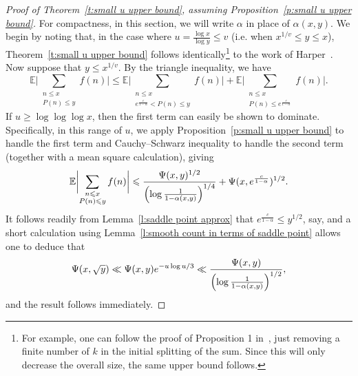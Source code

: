 \documentclass[12pt,a4paper,reqno]{amsart}
\numberwithin{equation}{section}
\def\E{\mathbb E}
\def\leq {\leqslant}
\theoremstyle{remark}
\theoremstyle{definition}
\numberwithin{equation}{section}
\theoremstyle{remark}
\def\E{\mathbb E}
\begin{document}
\begin{proof}[Proof of Theorem~\ref{t:small u upper bound}, assuming Proposition~\ref{p:small u upper bound}]
For compactness, in this section, we will write $\alpha$ in place of $\alpha(x,y)$. We begin by noting that, in the case where $u = \frac{\log x}{\log y} \leq v$ (i.e. when $x^{1/v} \leq y \leq x$), Theorem~\ref{t:small u upper bound} follows identically\footnote{For example, one can follow the proof of Proposition 1 in~\cite[Section~2.4]{HarperLow}, just removing a finite number of $k$ in the initial splitting of the sum. Since this will only decrease the overall size, the same upper bound follows.} to the work of Harper~\cite{HarperLow}. Now suppose that $y \leq x^{1/v}$. By the triangle inequality, we have
\begin{equation}\label{equ:ub triangle ineq}
\E \biggl| \sum_{\substack{n \leq x \\ P(n) \leq y}} f(n) \biggr| \leq \E \biggl| \sum_{\substack{n \leq x \\ e^{\frac{c}{1-\alpha}} < P(n) \leq y}} f(n) \biggr| + \E \biggl| \sum_{\substack{n \leq x \\ P(n) \leq e^{\frac{c}{1-\alpha}}}} f(n) \biggr| .
\end{equation}
If $u \geq \log \log \log x$, then the first term can easily be shown to dominate. Specifically, in this range of $u$, we apply Proposition~\ref{p:small u upper bound} to handle the first term and Cauchy--Schwarz inequality to handle the second term (together with a mean square calculation), giving
\[
\E \biggl| \sum_{\substack{n \leq x \\ P(n) \leq y}} f(n) \biggr| \leq \frac{\Psi(x,y)^{1/2}}{\Bigl(\log \frac{1}{1-\alpha(x,y)} \Bigr)^{1/4}} + \Psi(x,e^{\frac{c}{1 - \alpha}} )^{1/2} .
\]
It follows readily from Lemma~\ref{l:saddle point approx} that $e^{\frac{c}{1 - \alpha}} \leq y^{1/2}$, say, and a short calculation using Lemma~\ref{l:smooth count in terms of saddle point} allows one to deduce that
\[
\Psi(x,\sqrt{y}) \ll \Psi(x,y) e^{-u \log u/3} \ll \frac{\Psi(x,y)}{\Bigl(\log \frac{1}{1-\alpha(x,y)} \Bigr)^{1/2}} ,
\]
and the result follows immediately. 


\end{proof}
\end{document}
